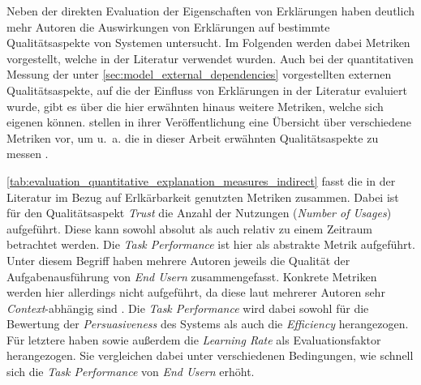 Neben der direkten Evaluation der Eigenschaften von Erklärungen haben deutlich mehr Autoren die Auswirkungen von Erklärungen auf bestimmte Qualitätsaspekte von Systemen untersucht. Im Folgenden werden dabei Metriken vorgestellt, welche in der Literatur verwendet wurden. Auch bei der quantitativen Messung der unter \autoref{sec:model_external_dependencies} vorgestellten externen Qualitätsaspekte, auf die der Einfluss von Erklärungen in der Literatur evaluiert wurde, gibt es über die hier erwähnten hinaus weitere Metriken, welche sich eigenen können. \citeauthor{carvalho2017quality} stellen in ihrer Veröffentlichung eine Übersicht über verschiedene Metriken vor, um u.~a. die in dieser Arbeit erwähnten Qualitätsaspekte zu messen \cite{carvalho2017quality}.

\autoref{tab:evaluation_quantitative_explanation_measures_indirect} fasst die in der Literatur im Bezug auf Erlkärbarkeit genutzten Metriken zusammen. Dabei ist für den Qualitätsaspekt \textit{Trust} die Anzahl der Nutzungen (\textit{Number of Usages}) aufgeführt. Diese kann sowohl absolut als auch relativ zu einem Zeitraum betrachtet werden. Die \textit{Task Performance} ist hier als abstrakte Metrik aufgeführt. Unter diesem Begriff haben mehrere Autoren jeweils die Qualität der Aufgabenausführung von \textit{End Usern} zusammengefasst. Konkrete Metriken werden hier allerdings nicht aufgeführt, da diese laut mehrerer Autoren sehr \textit{Context}-abhängig sind \cite{tintarev2007survey, gunning2019darpa}. Die \textit{Task Performance} wird dabei sowohl für die Bewertung der \textit{Persuasiveness} des Systems als auch die \textit{Efficiency} herangezogen. Für letztere haben \citeauthor{tintarev_designing_nodate} sowie \citeauthor{gunning2019darpa} außerdem die \textit{Learning Rate} als Evaluationsfaktor herangezogen. Sie vergleichen dabei unter verschiedenen Bedingungen, wie schnell sich die \textit{Task Performance} von \textit{End Usern} erhöht.

